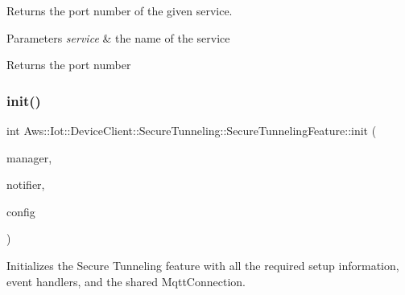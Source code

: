 Returns the port number of the given service. 


\begin{DoxyParams}{Parameters}
{\em service} & the name of the service \\
\hline
\end{DoxyParams}
\begin{DoxyReturn}{Returns}
the port number 
\end{DoxyReturn}
\mbox{\label{class_aws_1_1_iot_1_1_device_client_1_1_secure_tunneling_1_1_secure_tunneling_feature_ae8600a395ea715e35ccd12a8f79be34c}} 
\subsubsection{\texorpdfstring{init()}{init()}}
{\footnotesize\ttfamily int Aws\+::\+Iot\+::\+Device\+Client\+::\+Secure\+Tunneling\+::\+Secure\+Tunneling\+Feature\+::init (\begin{DoxyParamCaption}\item[{std\+::shared\+\_\+ptr$<$ \hyperlink{class_aws_1_1_iot_1_1_device_client_1_1_shared_crt_resource_manager}{Shared\+Crt\+Resource\+Manager} $>$}]{manager,  }\item[{std\+::shared\+\_\+ptr$<$ \hyperlink{class_aws_1_1_iot_1_1_device_client_1_1_client_base_notifier}{Client\+Base\+Notifier} $>$}]{notifier,  }\item[{const \hyperlink{struct_aws_1_1_iot_1_1_device_client_1_1_plain_config}{Plain\+Config} \&}]{config }\end{DoxyParamCaption})}



Initializes the Secure Tunneling feature with all the required setup information, event handlers, and the shared Mqtt\+Connection. 


